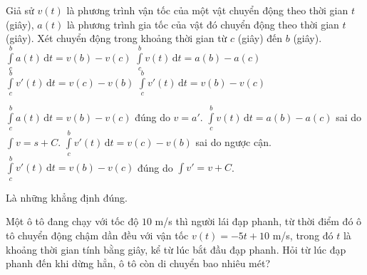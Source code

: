 \begin{ex}%

	Giả sử $v(t)$ là phương trình vận tốc của một vật chuyển động theo thời gian $t$ (giây), $a(t)$ là phương trình gia tốc của vật đó chuyển động theo thời gian $t$ (giây). Xét chuyển động trong khoảng thời gian từ $c$ (giây) đến $b$ (giây).
	\choiceTF
	{\True $\displaystyle\int\limits_c^b a(t)\mathrm{\,d}t=v(b)-v(c)$}
	{$\displaystyle\int\limits_c^b v(t)\mathrm{\,d}t=a(b)-a(c)$}
	{$\displaystyle\int\limits_c^b v'(t)\mathrm{\,d}t=v(c)-v(b)$}
	{\True $\displaystyle\int\limits_c^b v'(t)\mathrm{\,d}t=v(b)-v(c)$}
	\loigiai
	{
		\begin{itemchoice}
		\itemch $\displaystyle\int\limits_c^b a(t)\mathrm{\,d}t=v(b)-v(c)$ đúng do $v=a'$.
		\itemch $\displaystyle\int\limits_c^b v(t)\mathrm{\,d}t=a(b)-a(c)$ sai do $\displaystyle\int v = s+C$.
		\itemch $\displaystyle\int\limits_c^b v'(t)\mathrm{\,d}t=v(c)-v(b)$ sai do ngược cận.
		\itemch $\displaystyle\int\limits_c^b v'(t)\mathrm{\,d}t=v(b)-v(c)$ đúng do $\displaystyle\int v' = v+C$.
		\end{itemchoice}
		Là những khẳng định đúng.
	}
\end{ex}

\begin{bt}%

	Một ô tô đang chạy với tốc độ $10$ m/s thì người lái đạp phanh, từ thời điểm đó ô tô chuyển động chậm dần đều với vận tốc $v(t)=-5t+10$ m/s, trong đó $t$ là khoảng thời gian tính bằng giây, kể từ lúc bắt đầu đạp phanh. Hỏi từ lúc đạp phanh đến khi dừng hẳn, ô tô còn di chuyển bao nhiêu mét?
\end{bt}

